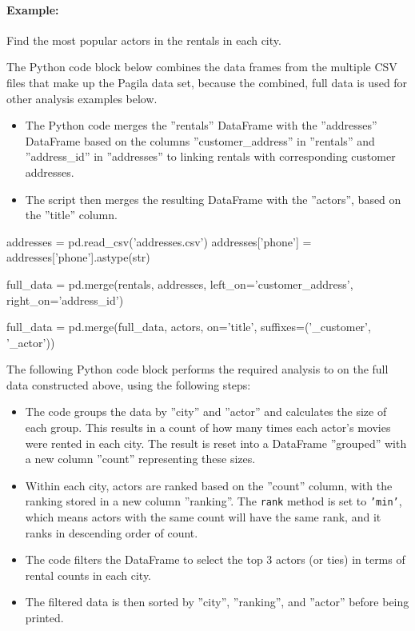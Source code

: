 \paragraph*{Example:} Find the most popular actors in the rentals in each city.

The Python code block below combines the data frames from the multiple CSV files that make up the Pagila data set, because the combined, full data is used for other analysis examples below.
\begin{itemize} 
\item The Python code merges the ''rentals'' DataFrame with the ''addresses'' DataFrame based on the columns ''customer\_address'' in ''rentals'' and ''address\_id'' in ''addresses'' to linking rentals with corresponding customer addresses.
\item The script then merges the resulting DataFrame with the ''actors'', based on the ''title'' column. 
\end{itemize}

\begin{samepage}
\begin{pythoncode}
addresses = pd.read_csv('addresses.csv')
addresses['phone'] = addresses['phone'].astype(str)

full_data = pd.merge(rentals, addresses, 
                     left_on='customer_address', 
                     right_on='address_id')
                 
full_data = pd.merge(full_data, actors, on='title', 
                     suffixes=('_customer', '_actor'))
\end{pythoncode}
\end{samepage}

The following Python code block performs the required analysis to on the full data constructed above, using the following steps:

\begin{itemize}
\item The code groups the data by ''city'' and ''actor'' and calculates the size of each group. This results in a count of how many times each actor's movies were rented in each city. The result is reset into a DataFrame ''grouped'' with a new column ''count'' representing these sizes.
\item Within each city, actors are ranked based on the ''count'' column, with the ranking stored in a new column ''ranking''. The \texttt{rank} method is set to \texttt{'min'}, which means actors with the same count will have the same rank, and it ranks in descending order of count.
\item The code filters the DataFrame to select the top 3 actors (or ties) in terms of rental counts in each city.
\item The filtered data is then sorted by ''city'', ''ranking'', and ''actor'' before being printed.
\end{itemize}

